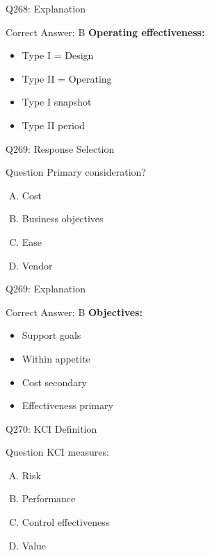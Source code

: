 \documentclass{beamer}
\begin{document}
	\begin{frame}{Q268: Explanation}
		\begin{block}{Correct Answer: B}
			\textbf{Operating effectiveness:}
			\begin{itemize}
				\item Type I = Design
				\item Type II = Operating
				\item Type I snapshot
				\item Type II period
			\end{itemize}
		\end{block}
	\end{frame}
	
	\begin{frame}{Q269: Response Selection}
		\begin{block}{Question}
			Primary consideration?
		\end{block}
		\begin{enumerate}[(A)]
			\item Cost
			\item Business objectives
			\item Ease
			\item Vendor
		\end{enumerate}
	\end{frame}
	
	\begin{frame}{Q269: Explanation}
		\begin{block}{Correct Answer: B}
			\textbf{Objectives:}
			\begin{itemize}
				\item Support goals
				\item Within appetite
				\item Cost secondary
				\item Effectiveness primary
			\end{itemize}
		\end{block}
	\end{frame}
	
	\begin{frame}{Q270: KCI Definition}
		\begin{block}{Question}
			KCI measures:
		\end{block}
		\begin{enumerate}[(A)]
			\item Risk
			\item Performance
			\item Control effectiveness
			\item Value
		\end{enumerate}
	\end{frame}
	
\end{document}
